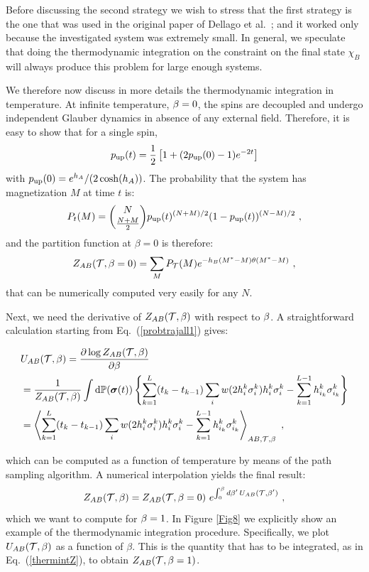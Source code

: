 \documentclass[aps,twocolumn,floats,pre,amsmath,superscriptaddress]{revtex4}
\newcommand{\beq}{\begin{equation}}
\newcommand{\eeq}{\end{equation}}
\def\TT{{\cal T}}\def\NN{{\cal N}} \def\BB{{\cal B}}\def\II{{\cal I}}
\newcommand{\<}{\langle}
\renewcommand{\>}{\rangle}
\newcommand{\bs}{ \mbox{\boldmath$\sigma$}}
\begin{document}
Before discussing the second strategy
we wish to stress that the
first strategy is the one that was used in the original paper of Dellago et al.~\cite{chandler};
and it worked only because the investigated system was extremely small. In general, we speculate
that doing the thermodynamic integration on the constraint on the final state $\chi_B$ will 
always produce this problem for large enough systems.

We therefore now discuss in more details the thermodynamic integration in temperature.
At infinite temperature, $\beta=0$, the spins are decoupled and undergo independent Glauber dynamics
in absence of any external field. Therefore, it is easy to show that for a single spin,
\beq
p_{\rm up}(t) = \frac12 \left[ 1 + (2 p_{\rm up}(0) - 1) e^{-2 t} \right]
\eeq
with $p_{\rm up}(0) = e^{h_A}/(2 \cosh(h_A))$. The probability that the system has magnetization $M$ at time
$t$ is:
\beq
P_t(M) = \binom{N}{\frac{N+M}2} p_{\rm up}(t)^{(N+M)/2} (1-p_{\rm up}(t) )^{(N-M)/2} \ ,
\eeq
and the partition function at $\beta=0$ is therefore:
\beq
Z_{AB}(\TT,\beta=0) = \sum_M P_\TT(M) e^{-h_B (M^* - M) \theta(M^* - M)} \ ,
\eeq
that can be numerically computed very easily for any $N$.

Next, we need the derivative of $Z_{AB}(\TT,\b)$ with respect to $\beta$. 
A straightforward calculation starting from Eq.~(\ref{probtrajall1})
gives:
\begin{widetext}
\beq\begin{split}
&U_{AB}(\TT,\b) = \frac{\partial \log Z_{AB}(\TT,\b)}{\partial \b} \\
& = \frac{1}{Z_{AB}(\TT,\b)} \int \text{d}\mathbb{P}(\bs(t))
\left\{
\sum_{k=1}^L (t_k-t_{k-1}) \sum_i w(2 h^{k}_i \sigma^{k}_i) h^{k}_i \sigma^{k}_i- \sum_{k=1}^{L-1} h^{k}_{i_k} \sigma^{k}_{i_k}
\right\} \\
& = \left\la \sum_{k=1}^L (t_k-t_{k-1})\sum_i w(2 h^{k}_i \sigma^{k}_i) h^{k}_i \sigma^{k}_i
- \sum_{k=1}^{L-1} h^{k}_{i_k} \sigma^{k}_{i_k} \right\ra_{AB,\TT,\b} \ ,
\end{split}
\label{thermint}
\eeq
\end{widetext}
which can be computed as a function of temperature by means of the path sampling algorithm.
A numerical interpolation yields the final result:
\beq\label{thermintZ}
Z_{AB}(\TT,\beta) = Z_{AB}(\TT,\beta=0) \, \, e^{\int_0^\b d\b' \, U_{AB}(\TT,\b')} \ ,
\eeq
which we want to compute for $\beta=1$.
In Figure \ref{Fig8} we explicitly show an example of the thermodynamic integration procedure. Specifically, 
we plot $U_{AB}(\TT,\b)$ as a function of $\beta$. This is the quantity that has to be
integrated, as in Eq.~(\ref{thermintZ}), to obtain $Z_{AB}(\TT,\beta=1)$.
\end{document}
